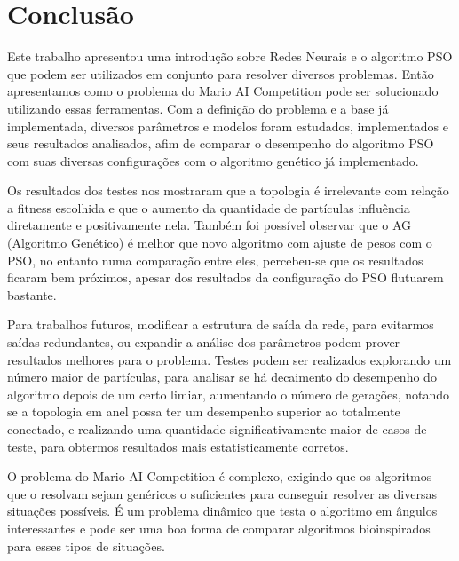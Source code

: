 \documentclass[a4paper,12pt]{article}
\begin{document}
  \section{Conclusão}

    Este trabalho apresentou uma introdução sobre Redes Neurais e o algoritmo PSO 
    que podem ser utilizados em conjunto para resolver diversos problemas. Então 
    apresentamos como o problema do Mario AI Competition pode ser solucionado 
    utilizando essas ferramentas. Com a definição do problema e a base já 
    implementada, diversos parâmetros e modelos foram estudados, implementados e 
    seus resultados analisados, afim de comparar o desempenho do algoritmo PSO com 
    suas diversas configurações com o algoritmo genético já implementado.

    Os resultados dos testes nos mostraram que a topologia é irrelevante com relação a 
    fitness escolhida e que o aumento da quantidade de partículas influência diretamente 
    e positivamente nela. Também foi possível observar que o AG (Algoritmo Genético) é 
    melhor que novo algoritmo com ajuste de pesos com o PSO, no entanto numa comparação 
    entre eles, percebeu-se que os resultados ficaram bem próximos, apesar dos 
    resultados da configuração do PSO flutuarem bastante.

    Para trabalhos futuros, modificar a estrutura de saída da rede, para evitarmos saídas 
    redundantes, ou expandir a análise dos parâmetros podem prover resultados melhores 
    para o problema. Testes podem ser realizados explorando um número maior de partículas, 
    para analisar se há decaimento do desempenho do algoritmo depois de um certo limiar, 
    aumentando o número de gerações, notando se a topologia em anel possa ter um desempenho 
    superior ao totalmente conectado, e realizando uma quantidade significativamente maior 
    de casos de teste, para obtermos resultados mais estatisticamente corretos.

    O problema do Mario AI Competition é complexo, exigindo que os algoritmos que o 
    resolvam sejam genéricos o suficientes para conseguir resolver as diversas situações 
    possíveis. É um problema dinâmico que testa o algoritmo em ângulos interessantes e pode 
    ser uma boa forma de comparar algoritmos bioinspirados para esses tipos de situações.

  
\end{document}
